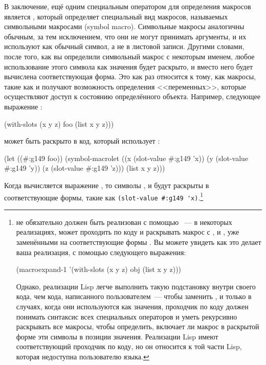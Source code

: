 В заключение, ещё одним специальным оператором для определения макросов является
, который определяет специальный вид макросов, называемых
символьными макросами (symbol macro).  Символьные макросы аналогичны обычным, за тем
исключением, что они не могут принимать аргументы, и их используют как обычный символ, а
не в листовой записи.  Другими словами, после того, как вы определили символьный макрос с
некоторым именем, любое использование этого символа как значения будет раскрыто, и вместо
него будет вычислена соответствующая форма.  Это как раз относится к тому, как макросы,
такие как  и  получают возможность определения
<<переменных>>, которые осуществляют доступ к состоянию определённого объекта.  Например,
следующее выражение :

\begin{myverb}
(with-slots (x y z) foo (list x y z)))
\end{myverb}

может быть раскрыто в код, который использует :

\begin{myverb}
(let ((#:g149 foo))
  (symbol-macrolet
      ((x (slot-value #:g149 'x))
       (y (slot-value #:g149 'y))
       (z (slot-value #:g149 'z)))
    (list x y z)))
\end{myverb}

Когда вычисляется выражение , то символы ,  и 
будут раскрыты в соответствующие формы, такие как \lstinline!(slot-value #:g149 'x)!.\footnote{ не обязательно должен быть реализован с помощью
  ~--- в некоторых реализациях,  может проходить по
  коду и раскрывать макрос с ,  и , уже заменёнными на
  соответствующие формы .  Вы можете увидеть как это делает ваша
  реализация, с помощью следующего выражения:

\begin{myverb}
(macroexpand-1 '(with-slots (x y z) obj (list x y z)))
\end{myverb}

Однако, реализации Lisp легче выполнить такую подстановку внутри своего кода, чем кода,
написанного пользователем~--- чтобы заменить ,  и  только в случаях,
когда они используются как значения, проходчик по коду должен понимать синтаксис всех
специальных операторов и уметь рекурсивно раскрывать все макросы, чтобы определить,
включает ли макрос в раскрытой форме эти символы в позиции значения.  Реализации Lisp
имеют соответствующий проходчик по коду, но он относится к той части Lisp, которая
недоступна пользователю языка.}

